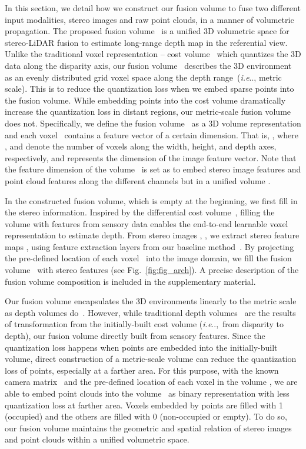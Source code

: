 \documentclass[letterpaper, 10 pt, conference]{ieeeconf}
\makeatletter
\DeclareRobustCommand\onedot{\futurelet\@let@token\@onedot}
\def\@onedot{\ifx\@let@token.\else.\null\fi\xspace}
\def\ie{\emph{i.e}\onedot} \def\Ie{{I.e}\onedot}
\newcommand{\Fref}[1]{Fig.~\textcolor{blue}{\ref{#1}}}
\makeatother
\begin{document}
In this section, we detail how we construct our fusion volume  to fuse two different input modalities, stereo images and raw point clouds, in a manner of volumetric propagation. The proposed fusion volume~ is a unified 3D volumetric space for stereo-LiDAR fusion to estimate long-range depth map  in the referential view. Unlike the traditional voxel representation -- cost volume~\cite{gcnet,psmnet,ganet} which quantizes the 3D data along the disparity axis, 
our fusion volume~ describes the 3D environment as an evenly distributed grid voxel space along the depth range~(\ie, metric scale). This is to reduce the quantization loss when we embed sparse points  into the fusion volume. While embedding points into the cost volume dramatically increase the quantization loss in distant regions, our metric-scale fusion volume does not. Specifically, we define the fusion volume~ as a 3D volume representation and each voxel~  contains a feature vector of a certain dimension. That is, , where ,  and  denote the number of voxels along the width, height, and depth axes, respectively, and  represents the dimension of the image feature vector. Note that the feature dimension of the volume~ is set as  to embed stereo image features and point cloud features along the different channels but in a unified volume .



In the constructed fusion volume, which is empty at the beginning, we first fill in the stereo information. Inspired by the differential cost volume~\cite{gcnet,psmnet}, filling the volume with features from sensory data enables the end-to-end learnable voxel representation to estimate depth. From stereo images , , we extract stereo feature maps ,  using feature extraction layers from our baseline method~\cite{psmnet}. By projecting the pre-defined location of each voxel~ into the image domain, we fill the fusion volume~ with stereo features (see \Fref{fig:fig_arch}). A precise description of the fusion volume composition is included in the supplementary material.


Our fusion volume encapsulates the 3D environments linearly to the metric scale as depth volumes do~\cite{pseudo_lidar,dsgn}. However, while traditional depth volumes~\cite{pseudo_lidar,dsgn} are the results of transformation from the initially-built cost volume (\ie,~from disparity to depth), our fusion volume directly built from sensory features. Since the quantization loss happens when points are embedded into the initially-built volume, direct construction of a metric-scale volume can reduce the quantization loss of points, especially at a farther area. For this purpose, with the known camera matrix~ and the pre-defined location of each voxel in the volume , we are able to embed point clouds  into the volume~ as binary representation with less quantization loss at farther area. Voxels embedded by points are filled with 1 (occupied) and the others are filled with 0 (non-occupied or empty). To do so, our fusion volume maintains the geometric and spatial relation of stereo images and point clouds within a unified volumetric space. 
\end{document}

